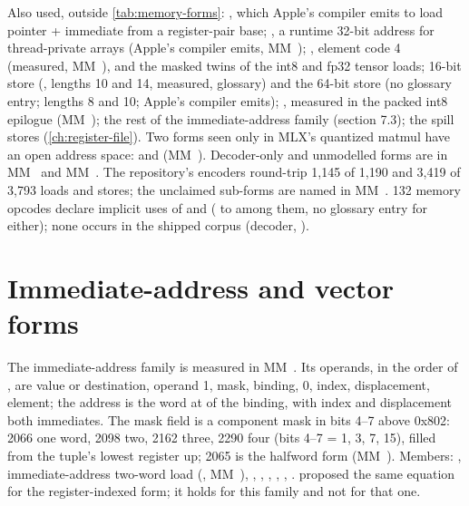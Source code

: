 Also used, outside \cref{tab:memory-forms}: , which Apple's compiler emits to load pointer +
immediate from a register-pair base; , a runtime 32-bit address for
thread-private arrays (Apple's compiler emits, MM~); , element code 4 (measured,
MM~), and the masked twins of the int8 and fp32 tensor loads; 16-bit store (, lengths 10 and 14, measured,
glossary) and the 64-bit store  (no glossary entry; lengths 8 and 10; Apple's compiler emits); , measured in the packed int8 epilogue (MM~); the rest of the immediate-address family (section
7.3); the spill stores (\cref{ch:register-file}). Two forms seen only in MLX's quantized matmul have an open address space:  and  (MM~). Decoder-only
and unmodelled forms are in MM~ and MM~. The repository's encoders round-trip 1,145 of 1,190 and 3,419 of 3,793 loads
and stores; the unclaimed sub-forms are named in MM~. 132 memory opcodes declare implicit uses of  and
 ( to  among them, no glossary entry for either); none occurs in the shipped corpus (decoder,
).

\section{Immediate-address and vector forms}\label{sec:immediate-address-vector-forms}

The immediate-address family is measured in MM~. Its operands, in the order of , are value or destination, operand 1,
mask, binding, 0, index, displacement, element; the address is the word at  of the
binding, with index and displacement both immediates. The mask field is a component mask in bits 4–7 above 0x802:
2066 one word, 2098 two, 2162 three, 2290 four (bits 4–7 = 1, 3, 7, 15), filled from the tuple's lowest register up;
2065 is the halfword form (MM~). Members: , immediate-address two-word
load (, MM~), , , , , , .  proposed the same
 equation for the register-indexed form; it holds for this family and not for that one.

